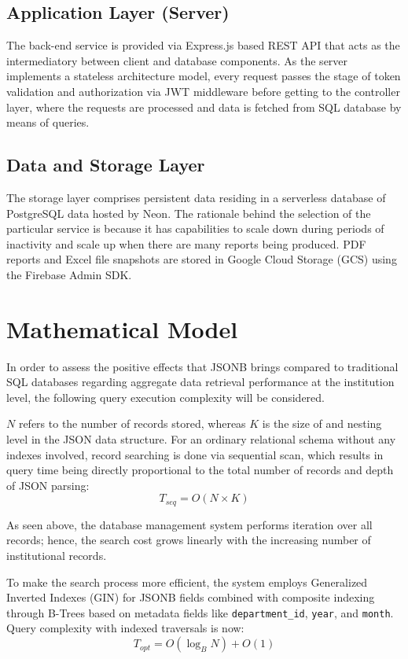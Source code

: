 \documentclass[conference]{IEEEtran}
\begin{document}
\subsection{Application Layer (Server)}
The back-end service is provided via Express.js based REST API that acts as the intermediatory between client and database components. As the server implements a stateless architecture model, every request passes the stage of token validation and authorization via JWT middleware before getting to the controller layer, where the requests are processed and data is fetched from SQL database by means of queries.

\subsection{Data and Storage Layer}
The storage layer comprises persistent data residing in a serverless database of PostgreSQL data hosted by Neon. The rationale behind the selection of the particular service is because it has capabilities to scale down during periods of inactivity and scale up when there are many reports being produced. PDF reports and Excel file snapshots are stored in Google Cloud Storage (GCS) using the Firebase Admin SDK.

\section{Mathematical Model}
In order to assess the positive effects that JSONB brings compared to traditional SQL databases regarding aggregate data retrieval performance at the institution level, the following query execution complexity will be considered.

$N$ refers to the number of records stored, whereas $K$ is the size of and nesting level in the JSON data structure. For an ordinary relational schema without any indexes involved, record searching is done via sequential scan, which results in query time being directly proportional to the total number of records and depth of JSON parsing:
\begin{equation}
T_{seq} = O(N \times K)
\end{equation}

As seen above, the database management system performs iteration over all records; hence, the search cost grows linearly with the increasing number of institutional records.

To make the search process more efficient, the system employs Generalized Inverted Indexes (GIN) for JSONB fields combined with composite indexing through B-Trees based on metadata fields like \texttt{department\_id}, \texttt{year}, and \texttt{month}. Query complexity with indexed traversals is now:
\begin{equation}
T_{opt} = O(\log_{B} N) + O(1)
\end{equation}
\end{document}
